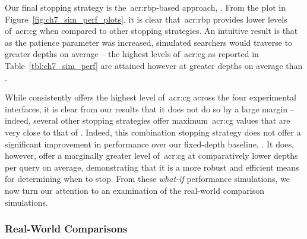 Our final stopping strategy is the~\gls{acr:rbp}-based approach, . From the plot in Figure~\ref{fig:ch7_sim_perf_plots}, it is clear that~\gls{acr:rbp} provides lower levels of~\gls{acr:cg} when compared to other stopping strategies. An intuitive result is that as the patience parameter was increased, simulated searchers would traverse to greater depths on average -- the highest levels of~\gls{acr:cg} as reported in Table~\ref{tbl:ch7_sim_perf} are attained however at greater depths on average than .

While  consistently offers the highest level of~\gls{acr:cg} across the four experimental interfaces, it is clear from our results that it does not do so by a large margin -- indeed, several other stopping strategies offer maximum~\gls{acr:cg} values that are very close to that of . Indeed, this combination stopping strategy does not offer a significant improvement in performance over our fixed-depth baseline, . It does, however, offer a marginally greater level of~\gls{acr:cg} at comparatively lower depths per query on average, demonstrating that it is a more robust and efficient means for determining when to stop. From these \emph{what-if} performance simulations, we now turn our attention to an examination of the real-world comparison simulations.

\subsubsection{Real-World Comparisons}\label{sec:snippets:simulations:results:comparisons}


